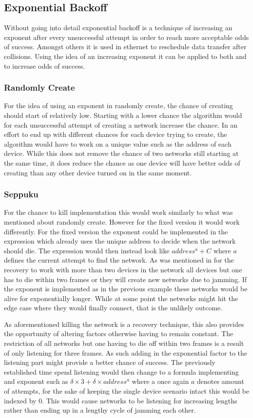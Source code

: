 \subsection{Exponential Backoff}
Without going into detail exponential backoff is a technique of increasing an exponent after every unsuccessful attempt in order to reach more acceptable odds of success.
Amongst others it is used in ethernet to reschedule data transfer after collisions. \citep{Ebackoff}
Using the idea of an increasing exponent it can be applied to both  and  to increase odds of success.
\subsubsection*{Randomly Create}
For the idea of using an exponent in randomly create, the chance of creating should start of relatively low.
Starting with a lower chance the algorithm would for each unsuccessful attempt of creating a network increase the chance.
In an effort to end up with different chances for each device trying to create, the algorithm would have to work on a unique value such as the address of each device.
While this does not remove the chance of two networks still starting at the same time, it does reduce the chance as one device will have better odds of creating than any other device turned on in the same moment.
\subsubsection*{Seppuku}
For the chance to kill implementation this would work similarly to what was mentioned about randomly create. 
However for the fixed version it would work differently.
For the fixed version the exponent could be implemented in the expression which already uses the unique address to decide when the network should die.
The expression would then instead look like $address^a + C$ where $a$ defines the current attempt to find the network.
As was mentioned in  for the recovery to work with more than two devices in the network all devices but one has to die within two frames or they will create new networks due to jamming.
If the exponent is implemented as in the previous example these networks would be alive for exponentially longer.
While at some point the networks might hit the edge case where they would finally connect, that is the unlikely outcome.

As aforementioned killing the network is a recovery technique, this also provides the opportunity of altering factors otherwise having to remain constant.
The restriction of all networks but one having to die off within two frames is a result of only listening for three frames.
As such adding in the exponential factor to the listening part might provide a better chance of success.
The previously established time spend listening would then change to a formula implementing and exponent such as $\delta \times 3 + \delta \times address^a$ where a once again $a$ denotes amount of attempts, for the sake of keeping the single device scenario intact this would be indexed by 0.
This would cause networks to be listening for increasing lengths rather than ending up in a lengthy cycle of jamming each other.

